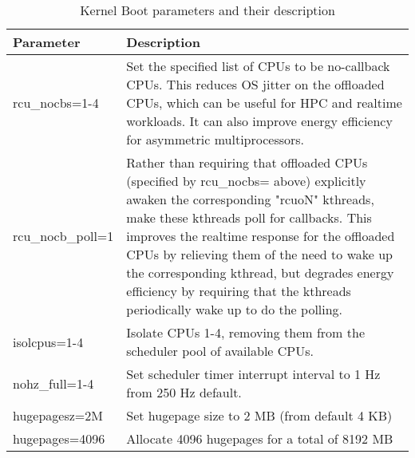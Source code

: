 \begin{table}
    \centering
    \caption{Kernel Boot parameters and their description}
    \label{tab:kernel_params_table}
\begin{tabular}{|l|p{10cm}|}
    \hline
    Parameter & Description \\
    \hline \hline
    rcu\_nocbs=1-4 & Set the specified list of CPUs to be no-callback CPUs.  This reduces OS jitter on the   offloaded CPUs, which can be useful for HPC and realtime workloads.  It can also improve energy efficiency for asymmetric multiprocessors. \\ 
    \hline
    rcu\_nocb\_poll=1 & Rather than requiring that offloaded CPUs (specified by rcu\_nocbs= above) explicitly awaken the corresponding "rcuoN" kthreads, make these kthreads poll for callbacks. This improves the realtime response for the offloaded CPUs by relieving them of the need to wake up the corresponding kthread, but degrades energy efficiency by requiring that the kthreads periodically wake up to do the polling. \\
    \hline
    isolcpus=1-4 & Isolate CPUs 1-4, removing them from the scheduler pool of available CPUs. \\ 
    \hline
    nohz\_full=1-4 & Set scheduler timer interrupt interval to 1 Hz from 250 Hz default. \\ 
    \hline
    hugepagesz=2M & Set hugepage size to 2 MB (from default 4 KB) \\
    \hline
    hugepages=4096 & Allocate 4096 hugepages for a total of 8192 MB \\ 
    \hline
\end{tabular}
\end{table}

